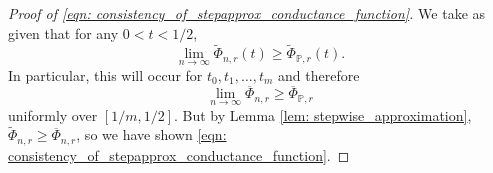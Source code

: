 \documentclass{article}
\newcommand{\1}{\mathbf{1}}
\newcommand{\Pbb}{\mathbb{P}}
\theoremstyle{aldenthm}
\begin{document}
\begin{proof}[Proof of \eqref{eqn: consistency_of_stepapprox_conductance_function}]
We take as given that for any $0 < t < 1/2$,
\begin{equation*}
\lim_{n \to \infty} \widetilde{\Phi}_{n,r}(t) \geq \widetilde{\Phi}_{\Pbb,r}(t).
\end{equation*}
In particular, this will occur for $t_0, t_1, \ldots, t_m$ and therefore
\begin{equation*}
\lim_{n \to \infty} \overline{\Phi}_{n,r} \geq \overline{\Phi}_{\Pbb,r}
\end{equation*}
uniformly over $[1/m,1/2]$. But by Lemma \ref{lem: stepwise_approximation}, $\widetilde{\Phi}_{n,r} \geq \overline{\Phi}_{n,r}$, so we have shown \eqref{eqn: consistency_of_stepapprox_conductance_function}.
\end{proof}
\end{document}
